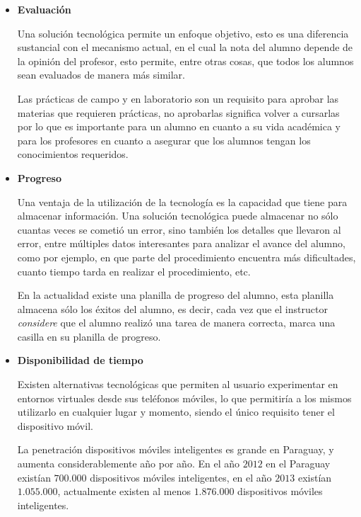 \begin{itemize}

\item \textbf{Evaluación}

	Una solución tecnológica permite un enfoque objetivo, esto es una diferencia
    sustancial con el mecanismo actual, en el cual la nota del alumno depende de
    la opinión del profesor, esto permite, entre otras cosas, que todos los
    alumnos sean evaluados de manera más similar.
    
    Las prácticas de campo y en laboratorio son un requisito para aprobar las
    materias que requieren prácticas, no aprobarlas significa volver a cursarlas
    por lo que es importante para un alumno en cuanto a su vida académica y para
    los profesores en cuanto a asegurar que los alumnos tengan los conocimientos
    requeridos.
    
    
\item \textbf{Progreso}

    Una ventaja de la utilización de la tecnología es la capacidad que tiene
    para almacenar información. Una solución tecnológica puede almacenar no sólo
    cuantas veces se cometió un error, sino también los detalles que llevaron al
    error, entre múltiples datos interesantes para analizar el avance del
    alumno, como por ejemplo, en que parte del procedimiento encuentra más
    dificultades, cuanto tiempo tarda en realizar el procedimiento, etc.

    En la actualidad existe una planilla de progreso del alumno, esta planilla
    almacena sólo los éxitos del alumno, es decir, cada vez que el instructor
    \emph{considere} que el alumno realizó una tarea de manera correcta, marca
    una casilla en su planilla de progreso.

   
    
\item \textbf{Disponibilidad de tiempo}

    Existen alternativas tecnológicas que permiten al usuario experimentar en
    entornos virtuales desde sus teléfonos móviles, lo que permitiría a los
    mismos utilizarlo en cualquier lugar y momento, siendo el único requisito
    tener el dispositivo móvil.
	
    La penetración dispositivos móviles inteligentes es grande en Paraguay, y
    aumenta considerablemente año por año. En el año $2012$ en el Paraguay existían
    $700.000$ dispositivos móviles inteligentes, en el año $2013$ existían
    $1.055.000$\cite{ultimahora:smartphones}, actualmente existen al menos
    $1.876.000$ dispositivos móviles inteligentes\cite{latamclick:2015}.


\end{itemize}
